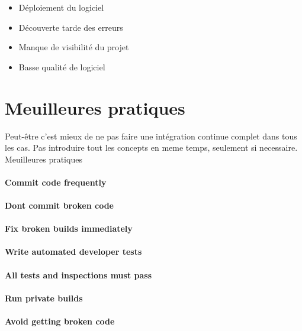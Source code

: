 \begin{itemize}
\item Déploiement du logiciel
\item Découverte tarde des erreurs
\item Manque de visibilité du projet
\item Basse qualité de logiciel
\end{itemize}

\section{Meuilleures pratiques}

Peut-être c'est mieux de ne pas faire une intégration continue complet dans tous les cas. Pas introduire tout les concepts en meme temps, seulement si necessaire.
Meuilleures pratiques

\paragraph{Commit code frequently}

\paragraph{Dont commit broken code}

\paragraph{Fix broken builds immediately}

\paragraph{Write automated developer tests}

\paragraph{All tests and inspections must pass}

\paragraph{Run private builds}

\paragraph{Avoid getting broken code}